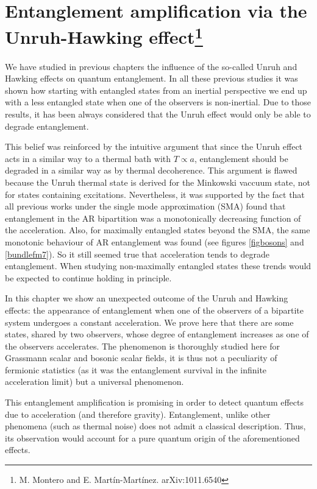 \chapter{Entanglement amplification via the Unruh-Hawking effect\footnote{M. Montero and E. Mart\'in-Mart\'inez. arXiv:1011.6540}}\label{generatio}


We have studied in previous chapters the influence of the so-called Unruh and Hawking effects on quantum entanglement. In all these previous studies it was shown how starting with entangled states from an inertial perspective we end up with a less entangled state when one of the observers is non-inertial. Due to those results, it has been always considered that the Unruh effect would only be able to degrade entanglement.

This belief was reinforced by the intuitive argument that since the Unruh effect acts in a similar way to a thermal bath with $T\propto a$,  entanglement should be degraded in a similar way as by thermal decoherence. This argument is flawed because the Unruh thermal state is derived for the Minkowski vaccuum state, not for states containing excitations. Nevertheless, it was supported  by the fact that all previous works under the single mode approximation (SMA) found that entanglement in the AR bipartition was a monotonically decreasing function of the acceleration. Also, for maximally entangled states beyond the SMA, the same monotonic behaviour of AR entanglement was found (see figures \ref{figbosons} and \ref{bundlefm7}). So it still seemed true that acceleration tends to degrade entanglement. When studying non-maximally entangled states these trends would be expected to continue holding in principle.

In this chapter we show an unexpected outcome of the Unruh and Hawking effects: the appearance of entanglement when one of the observers of a bipartite system undergoes a constant acceleration. We prove here that there are some states, shared by two observers, whose degree of entanglement increases as one of the observers accelerates. The phenomenon is thoroughly studied here for Grassmann scalar and bosonic scalar fields, it is thus not a peculiarity of fermionic statistics (as it was the entanglement survival in the infinite acceleration limit) but a universal phenomenon. 

This entanglement amplification is promising in order to detect quantum effects due to acceleration (and therefore gravity). Entanglement, unlike other phenomena (such as thermal noise) does not admit a classical description. Thus, its observation would account for a pure quantum origin of the aforementioned effects. 

